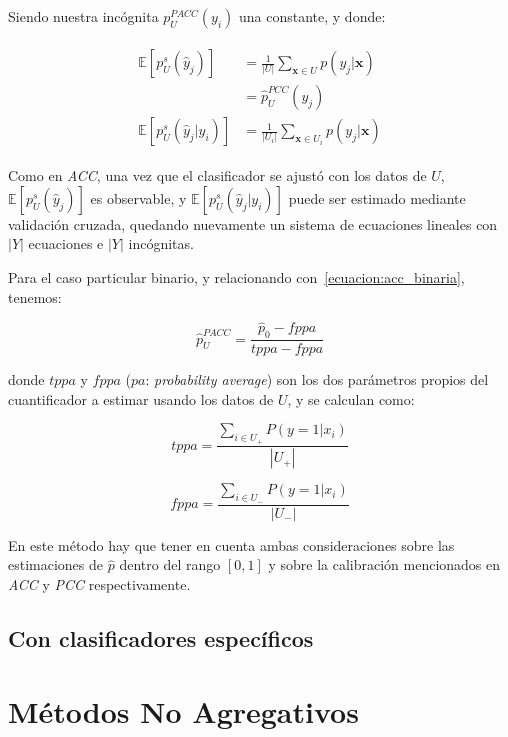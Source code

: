 Siendo nuestra incógnita $p^{PACC}_U(y_i)$ una constante, y donde:

\begin{align}
\begin{split}
    \mathbb{E}[p_{U}^{s}(\hat y_j)] &= \frac{1}{|U|}\sum_{\mathbf{x} \in U}{p(y_j|\mathbf{x})} \\
    &= \hat p^{PCC}_{U}(y_j) \\
    \mathbb{E}[p^{s}_{U}(\hat y_j|y_i)] &= \frac{1}{|U_i|}\sum_{\mathbf{x} \in U_i}{p(y_j|\mathbf{x})}
\end{split}
\end{align}

Como en {\it ACC}, una vez que el clasificador se ajustó con los datos de $U$,
$\mathbb{E}[p_{U}^{s}(\hat y_j)]$ es observable, y $\mathbb{E}[p^{s}_{U}(\hat
y_j|y_i)]$ puede ser estimado mediante validación cruzada, quedando nuevamente
un sistema de ecuaciones lineales con $|Y|$ ecuaciones e $|Y|$ incógnitas.

Para el caso particular binario, y relacionando con~\ref{ecuacion:acc_binaria},
tenemos:

\begin{equation}
    \hat p^{PACC}_{U} = \frac{\hat p_0-fppa}{tppa-fppa}
\end{equation}

donde $tppa$ y $fppa$ ($pa$: {\it probability average\/}) son los dos parámetros
propios del cuantificador a estimar usando los datos de $U$, y se calculan como:

\begin{equation}
    tppa = \frac{\sum _{i \in U_+}{P(y=1|x_i)}}{|U_+|}
\end{equation}

\begin{equation}
    fppa = \frac{\sum _{i \in U_-}{P(y=1|x_i)}}{|U_-|}
\end{equation}

En este método hay que tener en cuenta ambas consideraciones sobre las
estimaciones de $\hat p$ dentro del rango $[0, 1]$ y sobre la calibración
mencionados en {\it ACC\/} y {\it PCC\/} respectivamente.

\subsection{Con clasificadores específicos}

\section{Métodos No Agregativos}\label{puntual:no_agregativos}
